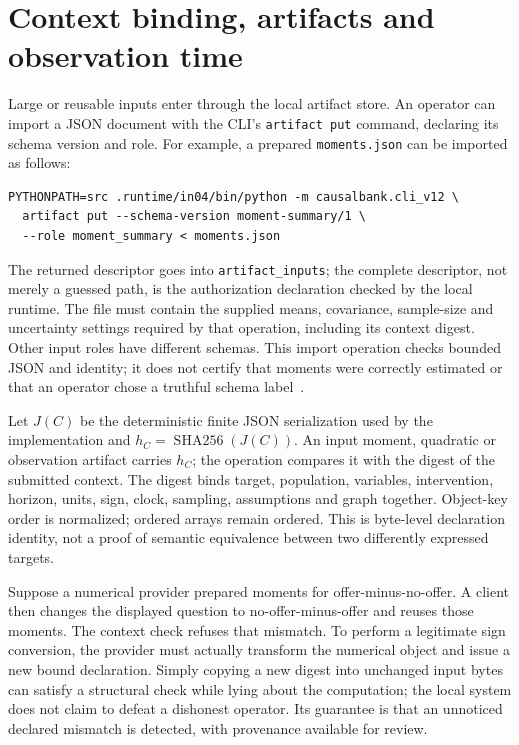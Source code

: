 \section{Context binding, artifacts and observation time}

Large or reusable inputs enter through the local artifact store. An operator
can import a JSON document with the CLI's \texttt{artifact put} command,
declaring its schema version and role. For example, a prepared
\texttt{moments.json} can be imported as follows:
\begin{lstlisting}
PYTHONPATH=src .runtime/in04/bin/python -m causalbank.cli_v12 \
  artifact put --schema-version moment-summary/1 \
  --role moment_summary < moments.json
\end{lstlisting}
The returned descriptor goes into \texttt{artifact\_inputs}; the complete
descriptor, not merely a guessed path, is the authorization declaration
checked by the local runtime. The file must contain the supplied means,
covariance, sample-size and uncertainty settings required by that operation,
including its context digest. Other input roles have different schemas.
This import operation checks bounded JSON and identity; it does not certify
that moments were correctly estimated or that an operator chose a truthful
schema label~\citep{exec13_i2_examples}.

Let $J(C)$ be the deterministic finite JSON serialization used by the
implementation and $h_C=\operatorname{SHA256}(J(C))$. An input moment,
quadratic or observation artifact carries $h_C$; the operation compares it
with the digest of the submitted context. The digest binds target,
population, variables, intervention, horizon, units, sign, clock, sampling,
assumptions and graph together. Object-key order is normalized; ordered
arrays remain ordered. This is byte-level declaration identity, not a proof
of semantic equivalence between two differently expressed targets.

Suppose a numerical provider prepared moments for offer-minus-no-offer.
A client then changes the displayed question to no-offer-minus-offer and
reuses those moments. The context check refuses that mismatch. To perform
a legitimate sign conversion, the provider must actually transform the
numerical object and issue a new bound declaration. Simply copying a new
digest into unchanged input bytes can satisfy a structural check while
lying about the computation; the local system does not claim to defeat a
dishonest operator. Its guarantee is that an unnoticed declared mismatch
is detected, with provenance available for review.

